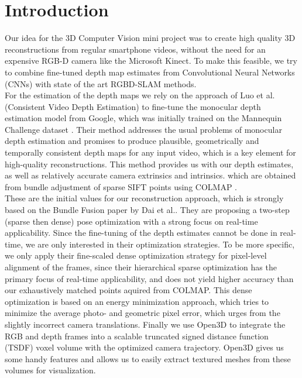 \chapter{Introduction}
    Our idea for the 3D Computer Vision mini project was to create high quality 3D reconstructions from regular smartphone videos, without the need for an expensive RGB-D camera like the Microsoft Kinect.
    To make this feasible, we try to combine fine-tuned depth map estimates from Convolutional Neural Networks (CNNs) with state of the art RGBD-SLAM methods.\\
    For the estimation of the depth maps we rely on the approach of Luo et al. \cite{luo2020consistent} (Consistent Video Depth Estimation) to fine-tune the monocular depth estimation model from Google, which was initially trained on the Mannequin Challenge dataset \cite{mannequin}.
    Their method addresses the usual problems of monocular depth estimation and promises to produce plausible, geometrically and temporally consistent depth maps for any input video, which is a key element for high-quality reconstructions.
    This method provides us with our depth estimates, as well as relatively accurate camera extrinsics and intrinsics. which are obtained from bundle adjustment of sparse SIFT points using COLMAP \cite{colmap}.\\
    These are the initial values for our reconstruction approach, which is strongly based on the Bundle Fusion paper \cite{dai2017bundlefusion} by Dai et al..
    They are proposing a two-step (sparse then dense) pose optimization with a strong focus on real-time applicability.
    Since the fine-tuning of the depth estimates cannot be done in real-time, we are only interested in their optimization strategies.
    To be more specific, we only apply their fine-scaled dense optimization strategy for pixel-level alignment of the frames, since their hierarchical sparse optimization has the primary focus of real-time applicability, and does not yield higher accuracy than our exhaustively matched points aquired from COLMAP.
    This dense optimization is based on an energy minimization approach, which tries to minimize the average photo- and geometric pixel error, which urges from the slightly incorrect camera translations.
    Finally we use Open3D \cite{open3d} to integrate the RGB and depth frames into a scalable truncated signed distance function (TSDF) voxel volume with the optimized camera trajectory. Open3D gives us some handy features and allows us to easily extract textured meshes from these volumes for visualization.